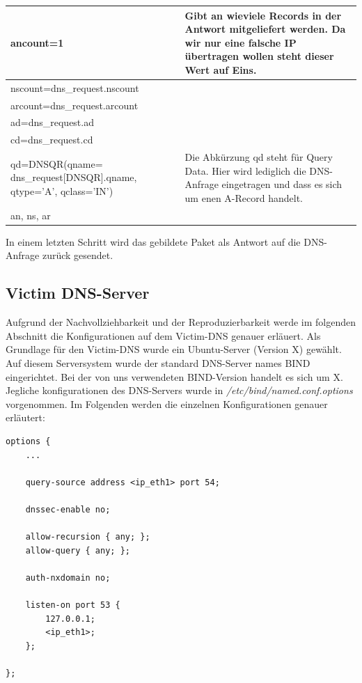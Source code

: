 \documentclass[10pt,a4paper]{article}
\begin{document}
\begin{center}
\begin{tabular}{ | p{4.8cm} | p{8.5cm} |}
    ancount=1 & Gibt an wieviele Records in der Antwort mitgeliefert werden. Da wir nur eine falsche IP übertragen wollen steht dieser Wert auf Eins.\\ \hline
    nscount=dns\_request.nscount & \\ \hline
    arcount=dns\_request.arcount & \\ \hline
    ad=dns\_request.ad & \\ \hline
    cd=dns\_request.cd & \\ \hline
    qd=DNSQR(qname= dns\_request[DNSQR].qname, qtype='A', qclass='IN') & Die Abkürzung qd steht für Query Data. Hier wird lediglich die DNS-Anfrage eingetragen und dass es sich um enen A-Record handelt.\\ \hline
    an, ns, ar & \\
    \hline
    \end{tabular}
\end{center}
In einem letzten Schritt wird das gebildete Paket als Antwort auf die DNS-Anfrage zurück gesendet.

\subsection{Victim DNS-Server}
Aufgrund der Nachvollziehbarkeit und der Reproduzierbarkeit werde im folgenden Abschnitt die Konfigurationen auf dem Victim-DNS genauer erläuert. Als Grundlage für den Victim-DNS wurde ein Ubuntu-Server (Version X) gewählt. Auf diesem Serversystem wurde der standard DNS-Server names BIND eingerichtet. Bei der von uns verwendeten BIND-Version handelt es sich um X. Jegliche konfigurationen des DNS-Servers wurde in \emph{/etc/bind/named.conf.options} vorgenommen. Im Folgenden werden die einzelnen Konfigurationen genauer erläutert:
\begin{center}
\begin{lstlisting}
options {
    ...

    query-source address <ip_eth1> port 54;

    dnssec-enable no;

    allow-recursion { any; };
    allow-query { any; };

    auth-nxdomain no;

    listen-on port 53 {
        127.0.0.1;
        <ip_eth1>;
    };

};
\end{lstlisting}
\end{center}
\end{document}
